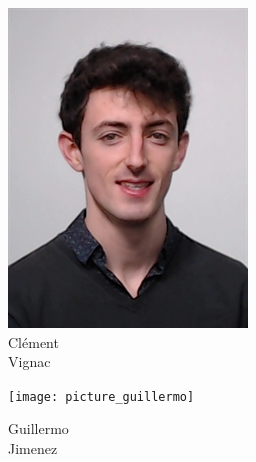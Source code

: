 \documentclass[aspectratio=169]{beamer}
\begin{document}
\begin{frame}
\begin{figure}
\begin{subfigure}[b]{0.14\linewidth}
			\includegraphics[width=\linewidth]{picture_clement}
			\caption*{Clément\\Vignac}
		\end{subfigure}
		\hfill
		\begin{subfigure}[b]{0.14\linewidth}
			\texttt{[image: picture\_guillermo]}
			\caption*{Guillermo\\Jimenez}
		\end{subfigure}
		\hfill
		\begin{subfigure}[b]{0.14\linewidth}

\end{subfigure}
\end{figure}
\end{frame}
\end{document}
